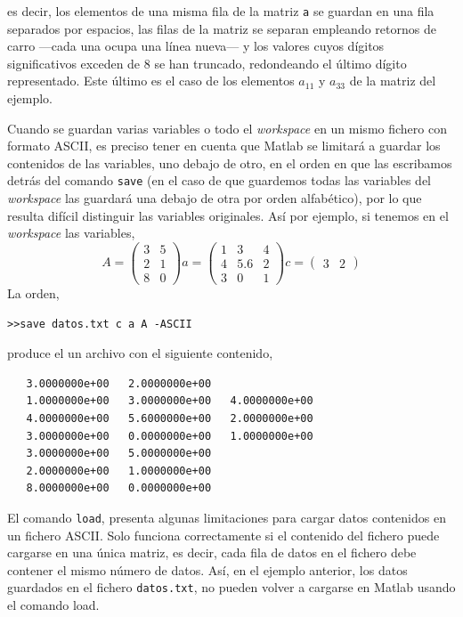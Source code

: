 es decir, los elementos de una misma fila de la matriz \texttt{a} se guardan en una fila separados por espacios, las filas de la matriz se separan empleando retornos de carro ---cada una ocupa una línea nueva--- y los valores cuyos dígitos significativos exceden de 8 se han truncado, redondeando el último dígito representado. Este último es el caso de los elementos $a_{11}$ y $a_{33}$ de la matriz del ejemplo.

Cuando se guardan varias variables o todo el \emph{workspace} en un mismo fichero con formato ASCII, es preciso tener en cuenta que Matlab se limitará a guardar los contenidos de las variables, uno debajo de otro, en el orden en que las escribamos detrás del comando \texttt{save} (en el caso de que guardemos todas las variables del \emph{workspace} las guardará una debajo de otra por orden alfabético), por lo que resulta difícil distinguir las variables originales.
Así por ejemplo, si tenemos en el \emph{workspace} las variables,
 \begin{equation*}
 A=
 \begin{pmatrix}
3&5\\
2&1\\
8&0
\end{pmatrix}
a=
\begin{pmatrix}
1&3&4\\
4&5.6&2\\
3&0&1
\end{pmatrix}
c=
\begin{pmatrix}
3&2
\end{pmatrix}
\end{equation*}
La orden,
\begin{verbatim}
>>save datos.txt c a A -ASCII
\end{verbatim}

produce el un archivo con el siguiente contenido,
\begin{verbatim}
   3.0000000e+00   2.0000000e+00
   1.0000000e+00   3.0000000e+00   4.0000000e+00
   4.0000000e+00   5.6000000e+00   2.0000000e+00
   3.0000000e+00   0.0000000e+00   1.0000000e+00
   3.0000000e+00   5.0000000e+00
   2.0000000e+00   1.0000000e+00
   8.0000000e+00   0.0000000e+00
\end{verbatim}

El comando \texttt{load}, presenta algunas limitaciones para cargar datos contenidos en un fichero ASCII. Solo funciona correctamente si el contenido del fichero puede cargarse en una única matriz, es decir, cada fila de datos en el fichero debe contener el mismo número de datos. Así, en el ejemplo anterior, los datos guardados en el fichero \texttt{datos.txt}, no pueden volver a cargarse en Matlab usando el comando load.

